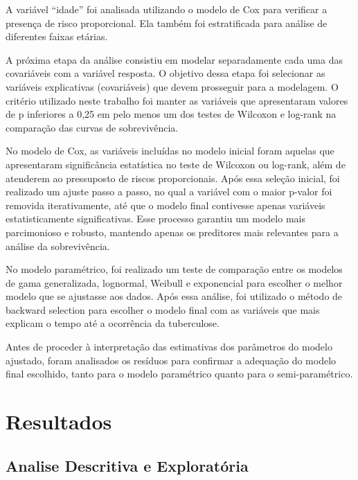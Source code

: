 \documentclass[
  letterpaper,
  DIV=11,
  numbers=noendperiod]{scrreprt}
\begin{document}
A variável ``idade'' foi analisada utilizando o modelo de Cox para
verificar a presença de risco proporcional. Ela também foi estratificada
para análise de diferentes faixas etárias.

A próxima etapa da análise consistiu em modelar separadamente cada uma
das covariáveis com a variável resposta. O objetivo dessa etapa foi
selecionar as variáveis explicativas (covariáveis) que devem prosseguir
para a modelagem. O critério utilizado neste trabalho foi manter as
variáveis que apresentaram valores de p inferiores a 0,25 em pelo menos
um dos testes de Wilcoxon e log-rank na comparação das curvas de
sobrevivência.

No modelo de Cox, as variáveis incluídas no modelo inicial foram aquelas
que apresentaram significância estatística no teste de Wilcoxon ou
log-rank, além de atenderem ao pressuposto de riscos proporcionais. Após
essa seleção inicial, foi realizado um ajuste passo a passo, no qual a
variável com o maior p-valor foi removida iterativamente, até que o
modelo final contivesse apenas variáveis estatisticamente
significativas. Esse processo garantiu um modelo mais parcimonioso e
robusto, mantendo apenas os preditores mais relevantes para a análise da
sobrevivência.

No modelo paramétrico, foi realizado um teste de comparação entre os
modelos de gama generalizada, lognormal, Weibull e exponencial para
escolher o melhor modelo que se ajustasse aos dados. Após essa análise,
foi utilizado o método de backward selection para escolher o modelo
final com as variáveis que mais explicam o tempo até a ocorrência da
tuberculose.

Antes de proceder à interpretação das estimativas dos parâmetros do
modelo ajustado, foram analisados os resíduos para confirmar a adequação
do modelo final escolhido, tanto para o modelo paramétrico quanto para o
semi-paramétrico.

\chapter{Resultados}\label{resultados}

\section{Analise Descritiva e
Exploratória}\label{analise-descritiva-e-exploratuxf3ria}
\end{document}
